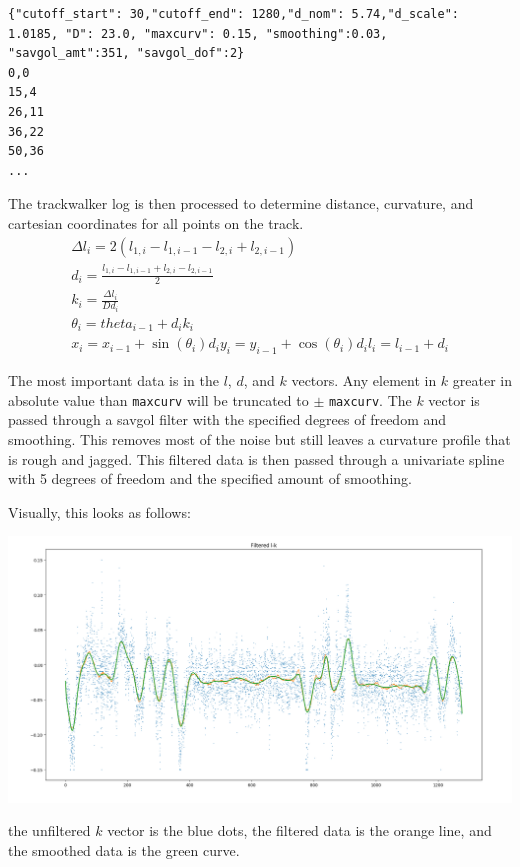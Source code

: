 \documentclass{article}
\begin{document}
\begin{lstlisting}
{"cutoff_start": 30,"cutoff_end": 1280,"d_nom": 5.74,"d_scale": 1.0185, "D": 23.0, "maxcurv": 0.15, "smoothing":0.03, "savgol_amt":351, "savgol_dof":2}
0,0
15,4
26,11
36,22
50,36
...
\end{lstlisting}

The trackwalker log is then processed to determine distance, curvature, and cartesian coordinates for all points on the track.
\begin{align}
	\Delta l_{i} = 2 (l_{1,i}-l_{1,i-1}-l_{2,i}+l_{2,i-1})\\
	d_i = \frac{l_{1,i}-l_{1,i-1} + l_{2,i} - l_{2,i-1}}{2}\\
	k_i = \frac{\Delta l_i}{D d_i}\\
	\theta_i = theta_{i-1} + d_i k_i\\
	x_i = x_{i-1} + \sin(\theta_i) d_i
	y_i = y_{i-1} + \cos(\theta_i) d_i
	l_i = l_{i-1} + d_i
\end{align}

The most important data is in the $l$, $d$, and $k$ vectors. Any element in $k$ greater in absolute value than \texttt{maxcurv} will be truncated to $\pm$ \texttt{maxcurv}. The $k$ vector is passed through a savgol filter with the specified degrees of freedom and smoothing. This removes most of the noise but still leaves a curvature profile that is rough and jagged. This filtered data is then passed through a univariate spline with 5 degrees of freedom and the specified amount of smoothing.

Visually, this looks as follows:

\includegraphics[width=\textwidth]{tw_filtering.png}

the unfiltered $k$ vector is the blue dots, the filtered data is the orange line, and the smoothed data is the green curve.
\end{document}
